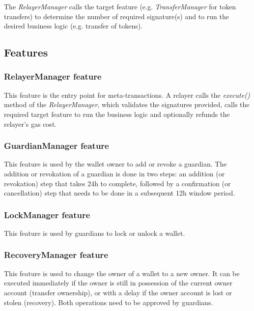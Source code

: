 \documentclass[12pt]{article}
\begin{document}
The \emph{RelayerManager} calls the target feature (e.g. \emph{TransferManager} for token transfers) to determine the number of required signature(s) and to run the desired business logic (e.g. transfer of tokens).

\subsection{Features}

\subsubsection{RelayerManager feature}\label{RelayerManager}

This feature is the entry point for meta-transactions. A relayer calls the \emph{execute()} method of the \emph{RelayerManager}, which validates the signatures provided, calls the required target feature to run the business logic and optionally refunds the relayer's gas cost.

\subsubsection{GuardianManager feature}

This feature is used by the wallet owner to add or revoke a guardian. The addition or revokation of a guardian is done in two steps: an addition (or revokation) step that takes 24h to complete, followed by a confirmation (or cancellation) step that needs to be done in a subsequent 12h window period.

\subsubsection{LockManager feature}

This feature is used by guardians to lock or unlock a wallet.

\subsubsection{RecoveryManager feature}

This feature is used to change the owner of a wallet to a new owner. It can be executed immediately if the owner is still in possession of the current owner account (transfer ownership), or with a delay if the owner account is lost or stolen (recovery). Both operations need to be approved by guardians.
\end{document}
